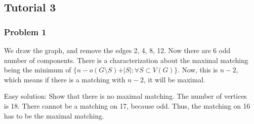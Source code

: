 \documentclass[11pt]{article}
\begin{document}
\subsection{Tutorial 3}
\label{sec:org6549b62}
\subsubsection{Problem 1}
\label{sec:org3bdc1f3}
We draw the graph, and remove the edges 2, 4, 8, 12. Now there are 6 odd
number of components. There is a characterization about the maximal matching
being the minimum of \(\{n - o(G\setminus S) + \vert S\vert\colon \forall S
    \subset V(G)\}\). Now, this is \(n-2\), which means if there is a matching with
\(n-2\), it will be maximal.

Easy solution: Show that there is no maximal matching. The number of
vertices is 18. There cannot be a matching on 17, because odd. Thus, the
matching on 16 has to be the maximal matching.
\end{document}
